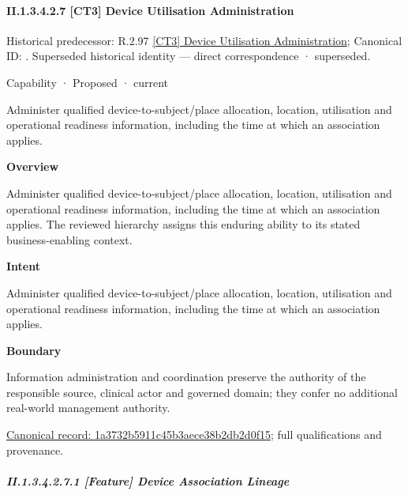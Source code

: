 \paragraph*{II.1.3.4.2.7 [CT3] Device Utilisation Administration}
\label{navigation:II.1.3.4.2.7}

{\small Historical predecessor: R.2.97 \hyperref[element:a0af0a86667d48f4ab95ed2920e878cb]{[CT3] Device Utilisation Administration}; Canonical ID: \texttt{}. Superseded historical identity — direct correspondence · superseded.}\par
\label{element:1a3732b5911c45b3aece38b2db2d0f15}
{\small Capability · Proposed · current}\par

Administer qualified device-to-subject/place allocation, location, utilisation and operational readiness information, including the time at which an association applies.



\textbf{Overview}



Administer qualified device-to-subject/place allocation, location, utilisation and operational readiness information, including the time at which an association applies. The reviewed hierarchy assigns this enduring ability to its stated business-enabling context.



\textbf{Intent}



Administer qualified device-to-subject/place allocation, location, utilisation and operational readiness information, including the time at which an association applies.



\textbf{Boundary}



Information administration and coordination preserve the authority of the responsible source, clinical actor and governed domain; they confer no additional real-world management authority.


{\footnotesize \href{../../../../continuum/strategy/capability/1a3732b5911c45b3aece38b2db2d0f15.md}{Canonical record: 1a3732b5911c45b3aece38b2db2d0f15}; full qualifications and provenance.}\par
\subparagraph*{II.1.3.4.2.7.1 [Feature] Device Association Lineage}
\label{navigation:II.1.3.4.2.7.1}


